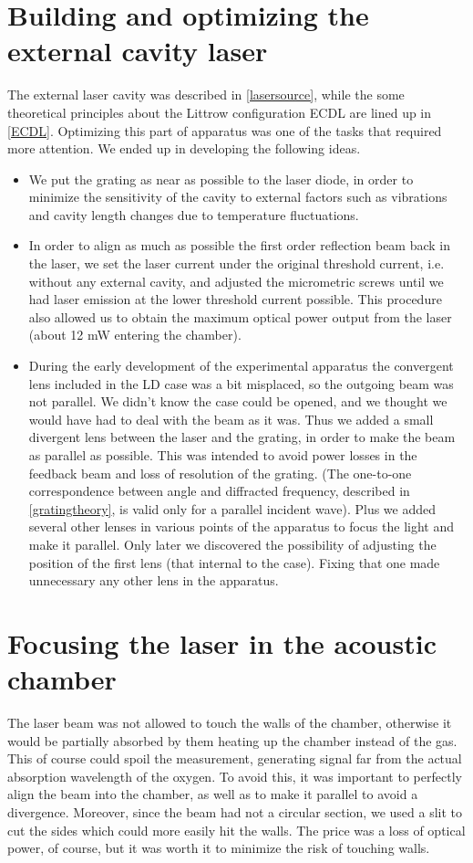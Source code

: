 	\section{Building and optimizing the external cavity laser}
The external laser cavity was described in \cref{lasersource}, while the some theoretical principles about the Littrow configuration ECDL are lined up in \cref{ECDL}. Optimizing this part of apparatus was one of the tasks that required more attention. We ended up in developing the following ideas.
\begin{itemize}
\item We put the grating as near as possible to the laser diode, in order to minimize the sensitivity of the cavity to external factors such as vibrations and cavity length changes due to temperature fluctuations.
\item In order to align as much as possible the first order reflection beam back in the laser, we set the laser current under the original threshold current, i.e. without any external cavity, and adjusted the micrometric screws until we had laser emission at the lower threshold current possible. This procedure also allowed us to obtain the maximum optical power output from the laser (about 12 mW entering the chamber). 
\item During the early development of the experimental apparatus the convergent lens included in the LD case was a bit misplaced, so the outgoing beam was not parallel. We didn't know the case could be opened, and we thought we would have had to deal with the beam as it was. Thus we added a small divergent lens between the laser and the grating, in order to make the beam as parallel as possible. This was intended to avoid power losses in the feedback beam and loss of resolution of the grating. (The one-to-one correspondence between angle and diffracted frequency, described in \cref{gratingtheory}, is valid only for a parallel incident wave). Plus we added several other lenses in various points of the apparatus to focus the light and make it parallel. Only later we discovered the possibility of adjusting the position of the first lens (that internal to the case). Fixing that one made unnecessary any other lens in the apparatus.
\end{itemize}

	\section{Focusing the laser in the acoustic chamber}\label{focusing}
The laser beam was not allowed to touch the walls of the chamber, otherwise it would be partially absorbed by them heating up the chamber instead of the gas. This of course could spoil the measurement, generating signal far from the actual absorption wavelength of the oxygen. To avoid this, it was important to perfectly align the beam into the chamber, as well as to make it parallel to avoid a divergence. Moreover, since the beam had not a circular section, we used a slit to cut the sides which could more easily hit the walls. The price was a loss of optical power, of course, but it was worth it to minimize the risk of touching walls.

